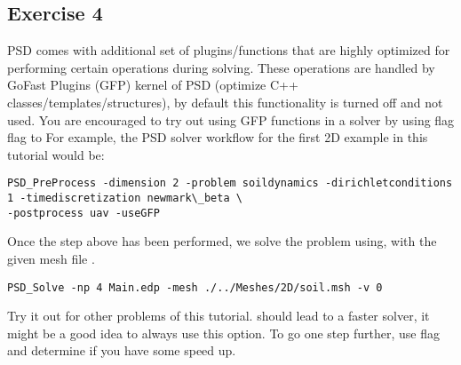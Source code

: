 \subsection{Exercise  4}

PSD comes with additional set of plugins/functions that are highly
optimized for performing certain operations during solving. These
operations are handled by GoFast Plugins (GFP) kernel of PSD (optimize
C++ classes/templates/structures), by default this functionality is
turned off and not used. You are encouraged to try out using GFP
functions in a solver by using  flag flag to
 For example, the PSD solver workflow for the first
2D example in this tutorial would be:

\begin{lstlisting}[style=BashInputStyle]
PSD_PreProcess -dimension 2 -problem soildynamics -dirichletconditions 1 -timediscretization newmark\_beta \
-postprocess uav -useGFP
\end{lstlisting}

Once the step above has been performed, we solve the problem using, with
the given mesh file \psd{soil.msh}.

\begin{lstlisting}[style=BashInputStyle]
PSD_Solve -np 4 Main.edp -mesh ./../Meshes/2D/soil.msh -v 0
\end{lstlisting}

Try it out for other problems of this tutorial.  should
lead to a faster solver, it might be a good idea to always use this
option. To go one step further, use \psd{-timelog} flag and determine if
you have some speed up.
